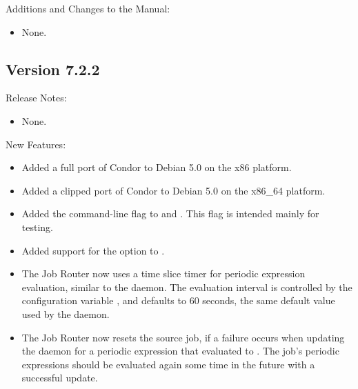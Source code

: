 \noindent Additions and Changes to the Manual:

\begin{itemize}

\item None.

\end{itemize}



\subsection*{\label{sec:New-7-2-2}Version 7.2.2}

\noindent Release Notes:

\begin{itemize}

\item None.

\end{itemize}


\noindent New Features:

\begin{itemize}

\item Added a full port of Condor to Debian 5.0 on the x86 platform.

\item Added a clipped port of Condor to Debian 5.0 on the x86\_64 platform.

\item Added the  command-line flag to 
and .  This flag is intended mainly for testing.

\item Added support for the  option to .

\item The Job Router now uses a time slice timer for periodic expression
  evaluation, similar to the  daemon.
  The evaluation interval is controlled by 
  the configuration variable ,
  and defaults to 60 seconds, the same default value used by
  the  daemon.

\item The Job Router now resets the source job, if a failure occurs when
  updating the  daemon for a periodic expression that
  evaluated to .  The job's periodic expressions should be
  evaluated again some time in the future with a successful update.

\end{itemize}


